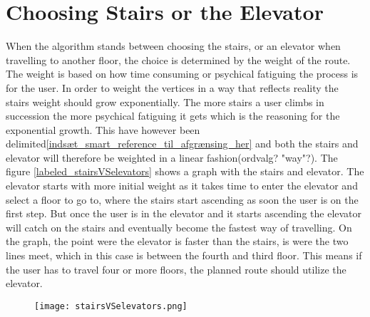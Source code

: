 \section{Choosing Stairs or the Elevator}
When the algorithm stands between choosing the stairs, or an elevator when travelling to another floor, the choice is determined by the weight of the route. The weight is based on how time consuming or psychical fatiguing the process is for the user. In order to weight the vertices in a way that reflects reality the stairs weight should grow exponentially. The more stairs a user climbs in succession the more psychical fatiguing it gets which is the reasoning for the exponential growth. This have however been delimited\cref{indsæt_smart_reference_til_afgrænsing_her} and both the stairs and elevator will therefore be weighted in a linear fashion(ordvalg? "way"?). The figure \cref{labeled_stairsVSelevators} shows a graph with the stairs and elevator. The elevator starts with more initial weight as it takes time to enter the elevator and select a floor to go to, where the stairs start ascending as soon the user is on the first step. But once the user is in the elevator and it starts ascending the elevator will catch on the stairs and eventually become the fastest way of travelling. On the graph, the point were the elevator is faster than the stairs, is were the two lines meet, which in this case is between the fourth and third floor. This means if the user has to travel four or more floors, the planned route should utilize the elevator.
\begin{figure}[ht!]
    \centering
    \texttt{[image: stairsVSelevators.png]}
    \label{fig:labeled_stairsVSelevators}
  \end{figure}
